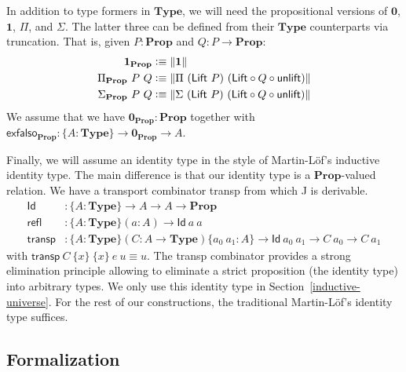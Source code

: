 \documentclass[autoref]{llncs}
\newcommand{\mType}{\mathbf{Type}}
\newcommand{\mProp}{\mathbf{Prop}}
\newcommand{\defeq}{\mathrel{\vcentcolon\equiv}}
\begin{document}
In addition to type formers in $\mType$, we will need the propositional versions
of $\mathbf{0}$, $\mathbf{1}$, $\Pi$, and $\Sigma$. The latter three can be defined from their
$\mType$ counterparts via truncation. That is, given $P : \mProp$ and $Q : P \to
\mProp$:
\vspace{-0.2em}
\begin{align*}
  \mathbf{1}_\mProp & \defeq \| \mathbf{1} \| \\
  \Pi_\mProp\ P\ Q & \defeq \| \Pi\ (\textsf{Lift} \ P)\ (\textsf{Lift} \circ Q \circ \textsf{unlift}) \| \\
  \Sigma_\mProp\ P\ Q & \defeq \| \Sigma\ (\textsf{Lift} \ P)\ (\textsf{Lift} \circ Q \circ \textsf{unlift}) \|
\end{align*}
We assume that we have
$\mathbf{0}_\mProp:\mProp$ together with $\mathsf{exfalso}_\mProp :\{A:\mType \} \to \mathbf{0}_\mProp \to A$.

Finally, we will assume an identity type in the style of Martin-L\"of's
inductive identity type. The main difference is that our identity type is a
$\mProp$-valued relation. We have a transport combinator
\textsf{transp} from which \textsf{J} is derivable.
\vspace{-0.2em}
\begin{align*}
  \textsf{Id} &: \{A : \mType \} \to A \to A \to \mProp \\
  \textsf{refl} &: \{A : \mType \} (a : A) \to \textsf{Id}\ a\ a \\
  \textsf{transp} &: \{A : \mType \} (C : A \to \mType) \{a_0\ a_1 : A\} \to \textsf{Id}\ a_0\ a_1 \to C\ a_0 \to C\ a_1
\end{align*}
with $\textsf{transp}\ C\ \{x\}\ \{x\}\ e\ u \equiv u$.
The \textsf{transp} combinator provides a strong elimination principle allowing
to eliminate a strict proposition (the identity type) into arbitrary types.
%
We only use this identity type in Section~\ref{inductive-universe}.
For the rest of our constructions, the traditional Martin-L\"of's identity type suffices.

%

\subsection{Formalization}
\end{document}
